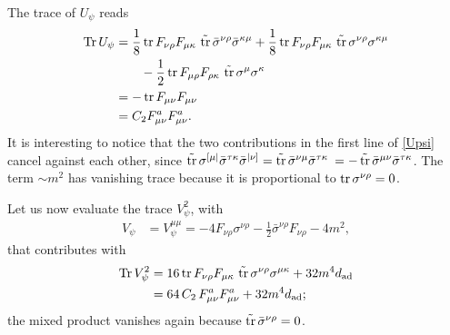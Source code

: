 The trace of \( U_\psi \) reads
\begin{equation}
\begin{split}
\operatorname{Tr} U_\psi
&	=
\frac{1}{8} 
	\operatorname{tr} F_{ \nu \rho } F_{ \mu \kappa } 
	\, \operatorname{\tilde{tr}} \bar \sigma^{\nu\rho} \bar \sigma^{ \kappa \mu }
+ \frac{1}{8}
	\operatorname{tr} F_{ \nu \rho } F_{ \mu \kappa } 
	\, \operatorname{\tilde{tr}} \sigma^{\nu\rho} \sigma^{ \kappa \mu }
\\
& \qquad 
- \frac{1}{2}
	\operatorname{tr} F_{ \mu \rho } F_{ \rho \kappa } 
	\, \operatorname{\tilde{tr}} \sigma^{\mu}  \sigma^{\kappa} 
\\
& =
- \operatorname{tr} F_{ \mu \nu} F_{ \mu \nu}
\\
& =
C_2  F^a_{ \mu \nu} F^a_{ \mu \nu}.
\end{split}
\end{equation}
It is interesting to notice that the two contributions in the first line of \eqref{Upsi} cancel against each other, since 
\(
\str \sigma\indices{^{[\mu|}}
\bar \sigma\indices{^{ \tau \kappa}}
\bar \sigma\indices{^{|\nu]}}
=
\str 
\bar\sigma\indices{^{\nu\mu }}
\bar \sigma\indices{^{ \tau \kappa\;}}
=
- 
\str\bar\sigma\indices{^{\mu \nu}}
\bar \sigma\indices{^{ \tau \kappa} }
\). The term $\sim m^2$ has vanishing trace because it is proportional to   \( \operatorname{tr}  \sigma^{\nu\rho} = 0\).

Let us now evaluate the trace $V_\psi^2$, with
\begin{equation}
\begin{split}
V_\psi
& =  V_\psi^{\mu\mu}
= - 4 F_{\nu\rho} \sigma^{\nu\rho} %
	- \frac{1}{2} \bar \sigma^{\nu\rho} F_{\nu\rho} - 4 m^2,
\end{split}
\end{equation}
that contributes with
\begin{equation}
\begin{split}
\operatorname{Tr} V_\psi^2
& =
16 \operatorname{tr} F_{\nu\rho}  F_{\mu\kappa} \, \operatorname{\tilde{tr}}\sigma^{\nu\rho}  \sigma^{\mu\kappa} 
	+ 32 m^4 d_{ \text{ad} }
\\
& = 
 64 \, C_2 \, F^a_{\mu\nu}  F^a_{\mu\nu} 
	+ 32 m^4 d_{ \text{ad} };
\end{split}
\end{equation}
the mixed product vanishes again because \( \operatorname{\tilde{tr}} \bar \sigma^{\nu\rho} = 0 \).


